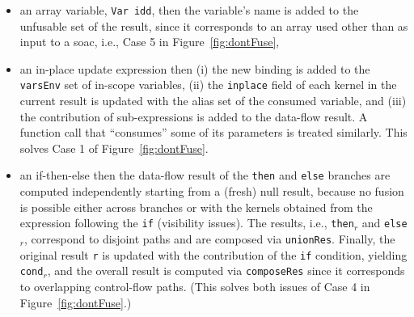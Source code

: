 \documentclass{sigplanconf}  %
\newcommand{\emp}[1]{\textcolor{DikuRed}{ #1}}
\begin{document}
\begin{itemize}
    \item an array variable, {\tt Var idd}, then the variable's 
            name is added to the unfusable set of the result,
            since it corresponds to an array used other than as 
            input to a {\sc soac}, i.e., \emp{Case 5} in Figure~\ref{fig:dontFuse},
    \item an in-place update expression then (i) the new binding is added to the
            {\tt varsEnv} set of in-scope variables, (ii) the {\tt inplace}
            field of each kernel in the current result is updated with the
            alias set of the consumed variable, and (iii) the contribution of
            sub-expressions is added to the data-flow result. A function call
                that ``consumes'' some of its parameters is treated similarly.
                This solves \emp{Case 1} of Figure~\ref{fig:dontFuse}.
    \item an if-then-else then the data-flow result of the {\tt then} and
            {\tt else} branches are computed independently starting from a 
            (fresh) null result, because no fusion is possible either across 
            branches or with the kernels obtained from the expression following 
            the {\tt if} (visibility issues). The results, i.e., {\tt then$_r$} and 
            {\tt else$_r$}, correspond to disjoint paths and are composed via 
            {\tt unionRes}.   Finally, the original result {\tt r} is updated 
            with the contribution of the {\tt if} condition, yielding {\tt cond$_r$},
            and the overall result is computed via {\tt composeRes} since it
            corresponds to overlapping control-flow paths.
            (This solves both issues of \emp{Case 4} in Figure~\ref{fig:dontFuse}.)            

\end{itemize}
\end{document}
